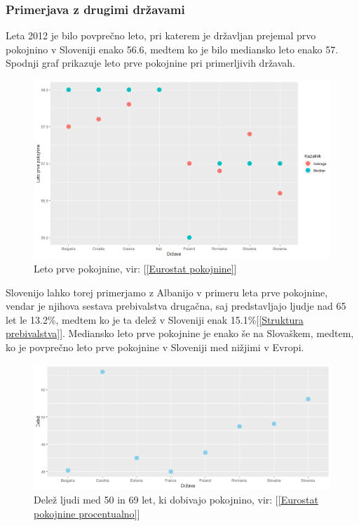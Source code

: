 \documentclass[12pt, a4paper]{article}
\begin{document}
\subsubsection[Primerjava z drugimi državami]{Primerjava z drugimi državami}
Leta 2012 je bilo povprečno leto, pri katerem je državljan prejemal prvo pokojnino v Sloveniji enako 56.6, medtem ko je bilo mediansko leto enako 57. Spodnji graf prikazuje leto prve pokojnine pri primerljivih državah.
\begin{figure}[h]
\centering
\includegraphics[height = 7 cm]{leto_prve_pokojnine.png}
\caption{Leto prve pokojnine, vir: [\ref{Eurostat pokojnine}]}
\label{Slika 2}
\end{figure}
Slovenijo lahko torej primerjamo z Albanijo v primeru leta prve pokojnine, vendar je njihova sestava prebivalstva drugačna, saj predstavljajo ljudje nad 65 let le 13.2\%, medtem ko je ta delež v Sloveniji enak 15.1\%[\ref{Struktura prebivalstva}]. Mediansko leto prve pokojnine je enako še na Slovaškem, medtem, ko je povprečno leto prve pokojnine v Sloveniji med nižjimi v Evropi.

\begin{figure}[h!]
\centering
\includegraphics[width = 13 cm]{graf_procentualno_pokojnina.png}
\caption{Delež ljudi med 50 in 69 let, ki dobivajo pokojnino, vir: [\ref{Eurostat pokojnine procentualno}]}
\label{Slika 3}
\end{figure}
\end{document}

